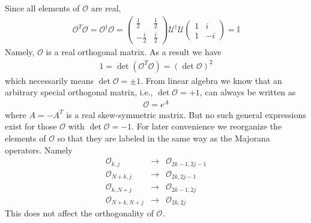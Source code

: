 Since all elements of $\mathcal{O}$ are real,
\begin{eqnarray}
	\mathcal{O}^T \mathcal{O} = \mathcal{O}^\dag \mathcal{O} = \begin{pmatrix}
		\frac{1}{2} & \frac{1}{2}\\
		-\frac{i}{2} & \frac{i}{2}
	\end{pmatrix} \mathcal{U}^\dag \mathcal{U} \begin{pmatrix}
		1 & i\\
		1 & -i
	\end{pmatrix} = \mathbb{I}
\end{eqnarray}
Namely, $\mathcal{O}$ is a real orthogonal matrix. As a result we have
\begin{eqnarray}
	1 = \det(\mathcal{O}^T\mathcal{O}) = (\det{\mathcal{O}})^2
\end{eqnarray}
which necessarily means $\det{\mathcal{O}} = \pm 1$. From linear algebra we know that an arbitrary special orthogonal matrix, i.e., $\det{\mathcal{O}} = +1$, can always be written as
\begin{eqnarray}
	\mathcal{O} = e^A
\end{eqnarray}
where $A = -A^T$ is a real skew-symmetric matrix. But no such general expressions exist for those $\mathcal{O}$ with $\det \mathcal{O} = -1$. For later convenience we reorganize the elements of $\mathcal{O}$ so that they are labeled in the same way as the Majorana operators. Namely
\begin{eqnarray}
	\mathcal{O}_{k,j}&\rightarrow&\mathcal{O}_{2k-1,2j-1}\\\nonumber
	\mathcal{O}_{N+k,j}&\rightarrow&\mathcal{O}_{2k,2j-1}\\\nonumber
	\mathcal{O}_{k,N+j}&\rightarrow&\mathcal{O}_{2k-1,2j}\\\nonumber
	\mathcal{O}_{N+k,N+j}&\rightarrow&\mathcal{O}_{2k,2j}
\end{eqnarray}
This does not affect the orthogonality of $\mathcal{O}$.

